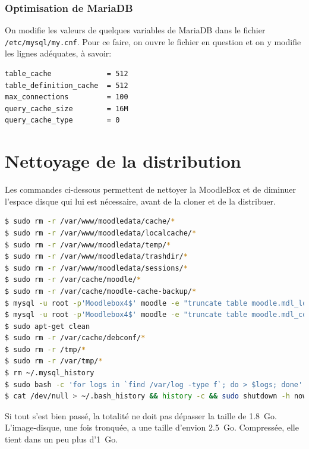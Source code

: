 \documentclass[11pt]{article}
\begin{document}
\subsubsection{Optimisation de MariaDB}

On modifie les valeurs de quelques variables de MariaDB dans le fichier \lstinline{/etc/mysql/my.cnf}. Pour ce faire, on ouvre le fichier en question
et on y modifie les lignes adéquates, à savoir:
\begin{lstlisting}[language=bash]
table_cache             = 512
table_definition_cache  = 512
max_connections         = 100
query_cache_size        = 16M
query_cache_type        = 0
\end{lstlisting}

\section{Nettoyage de la distribution}

Les commandes ci-dessous permettent de nettoyer la MoodleBox et de diminuer l'espace disque qui lui est nécessaire, avant de la cloner et de la distribuer.

\begin{lstlisting}[language=bash]
$ sudo rm -r /var/www/moodledata/cache/*
$ sudo rm -r /var/www/moodledata/localcache/*
$ sudo rm -r /var/www/moodledata/temp/*
$ sudo rm -r /var/www/moodledata/trashdir/*
$ sudo rm -r /var/www/moodledata/sessions/*
$ sudo rm -r /var/cache/moodle/*
$ sudo rm -r /var/cache/moodle-cache-backup/*
$ mysql -u root -p'Moodlebox4$' moodle -e "truncate table moodle.mdl_logstore_standard_log"
$ mysql -u root -p'Moodlebox4$' moodle -e "truncate table moodle.mdl_config_log"
$ sudo apt-get clean
$ sudo rm -r /var/cache/debconf/*
$ sudo rm -r /tmp/*
$ sudo rm -r /var/tmp/*
$ rm ~/.mysql_history
$ sudo bash -c 'for logs in `find /var/log -type f`; do > $logs; done'
$ cat /dev/null > ~/.bash_history && history -c && sudo shutdown -h now
\end{lstlisting}

Si tout s'est bien passé, la totalité ne doit pas dépasser la taille de 1.8~Go. L'image-disque, une fois tronquée, a une taille d'envion 2.5~Go. Compressée, elle tient dans un peu plus d'1~Go.
\end{document}
